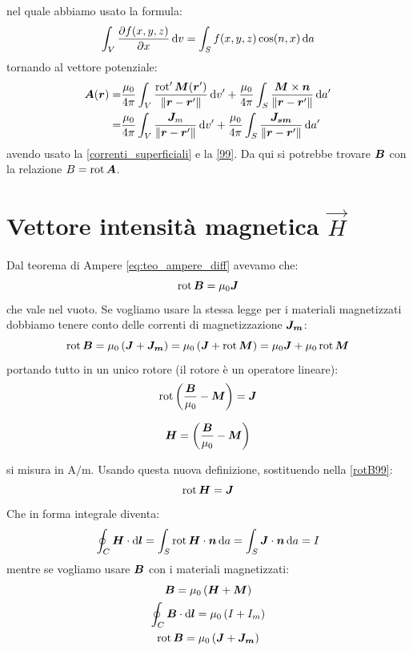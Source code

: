 nel quale abbiamo usato la formula:
\begin{equation}
  \int_V\frac{\partial f(x,y,z)}{\partial x}\,\mathrm{d} v=\int_S f(x,y,z)\cos(n,x)\,\mathrm{d} a
\end{equation}
tornando al vettore potenziale:
\begin{equation}
  \begin{split}
    \boldsymbol{A}(\boldsymbol{r})=&\frac{\mu_0}{4\pi}\int_V\frac{\operatorname{rot}'\boldsymbol{M}(\boldsymbol{r}')}{\left\lVert\boldsymbol{r}-\boldsymbol{r}'\right\rVert}\,\mathrm{d} v'+\frac{\mu_0}{4\pi}\int_S\frac{\boldsymbol{M}\times\boldsymbol{n}}{\left\lVert\boldsymbol{r}-\boldsymbol{r}'\right\rVert}\,\mathrm{d} a'\\
    =&\frac{\mu_0}{4\pi}\int_V\frac{\boldsymbol{J}_m}{\left\lVert\boldsymbol{r}-\boldsymbol{r}'\right\rVert}\,\mathrm{d} v'+\frac{\mu_0}{4\pi}\int_S\frac{\boldsymbol{J_{sm}}}{\left\lVert\boldsymbol{r}-\boldsymbol{r}'\right\rVert}\,\mathrm{d} a'
  \end{split}
\end{equation}
avendo usato la \eqref{correnti_superficiali} e la \eqref{99}. Da qui si potrebbe trovare $\boldsymbol{B}$ con la relazione $B=\operatorname{rot}\boldsymbol{A}$.
\section{Vettore intensità magnetica \texorpdfstring{$\vec H$}{H}}
Dal teorema di Ampere \eqref{eq:teo_ampere_diff} avevamo che:
\begin{equation}
  \operatorname{rot}\boldsymbol{B}=\mu_0\boldsymbol{J}
\end{equation}
che vale nel vuoto. Se vogliamo usare la stessa legge per i materiali magnetizzati dobbiamo tenere conto delle correnti di magnetizzazione $\boldsymbol{J_m}$:
\begin{equation}
  \operatorname{rot}\boldsymbol{B}=\mu_0\left(\boldsymbol{J}+\boldsymbol{J_m}\right)=\mu_0\left(\boldsymbol{J}+\operatorname{rot}\boldsymbol{M}\right)=\mu_0\boldsymbol{J}+\mu_0\operatorname{rot}\boldsymbol{M}
\end{equation}
portando tutto in un unico rotore (il rotore è un operatore lineare):
\begin{equation}
  \operatorname{rot}\left(\frac{\boldsymbol{B}}{\mu_0}-\boldsymbol{M}\right)=\boldsymbol{J}
  \label{rotB99}
\end{equation}
\begin{Def}
  \begin{equation}
    \boldsymbol{H}=\left(\frac{\boldsymbol{B}}{\mu_0}-\boldsymbol{M}\right)
  \end{equation}
\end{Def}
si misura in $\si{\ampere\per\meter}$. Usando questa nuova definizione, sostituendo nella \eqref{rotB99}:
\begin{equation}
  \operatorname{rot}\boldsymbol{H}=\boldsymbol{J}
\end{equation}
Che in forma integrale diventa:
\begin{equation}
  \oint_C\boldsymbol{H}\cdot\mathrm{d}\boldsymbol{l}=\int_S\operatorname{rot} \boldsymbol{H}\cdot\boldsymbol{n}\,\mathrm{d} a=\int_S\boldsymbol{J}\cdot\boldsymbol{n}\,\mathrm{d} a=I
\end{equation}
mentre se vogliamo usare $\boldsymbol{B}$ con i materiali magnetizzati:
\begin{gather}
  \boldsymbol{B}=\mu_0\left(\boldsymbol{H}+\boldsymbol{M}\right)\\
  \oint_C\boldsymbol{B}\cdot\mathrm{d}\boldsymbol{l}=\mu_0\left(I+I_m\right)\\
  \operatorname{rot}\boldsymbol{B}=\mu_0\left(\boldsymbol{J}+\boldsymbol{J_m}\right)
\end{gather}

